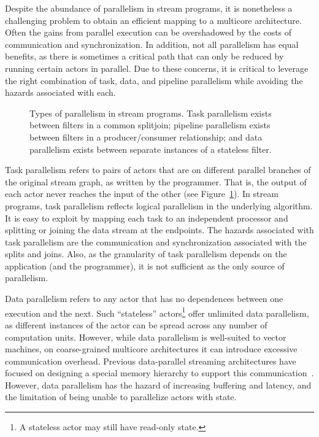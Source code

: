 
Despite the abundance of parallelism in stream programs, it is
nonetheless a challenging problem to obtain an efficient mapping to a
multicore architecture.  Often the gains from parallel execution can
be overshadowed by the costs of communication and synchronization.  In
addition, not all parallelism has equal benefits, as there is
sometimes a critical path that can only be reduced by running certain
actors in parallel.  Due to these concerns, it is critical to leverage
the right combination of task, data, and pipeline parallelism while
avoiding the hazards associated with each.

\begin{figure}[t]
\centering
{}
\caption[Types of parallelism in stream programs]{Types of parallelism
  in stream programs.  Task parallelism exists between filters in a
  common splitjoin; pipeline parallelism exists between filters in a
  producer/consumer relationship; and data parallelism exists between
  separate instances of a stateless
  filter.\protect\label{fig:parallelism}}
\end{figure}

Task parallelism refers to pairs of actors that are on different
parallel branches of the original stream graph, as written by the
programmer.  That is, the output of each actor never reaches the input
of the other (see Figure~\ref{fig:parallelism}).  In stream
programs, task parallelism reflects logical parallelism in the
underlying algorithm.  It is easy to exploit by mapping each task to
an independent processor and splitting or joining the data stream at
the endpoints.  The hazards associated with task parallelism are the
communication and synchronization associated with the splits and
joins.  Also, as the granularity of task parallelism depends on the
application (and the programmer), it is not sufficient as the only
source of parallelism.

Data parallelism refers to any actor that has no dependences between
one execution and the next.  Such ``stateless'' actors\footnote{A
  stateless actor may still have read-only state.}  offer unlimited
data parallelism, as different instances of the actor can be spread
across any number of computation units.  However, while data
parallelism is well-suited to vector machines, on coarse-grained
multicore architectures it can introduce excessive communication
overhead.  Previous data-parallel streaming architectures have focused
on designing a special memory hierarchy to support this
communication~\cite{imagine03ieee}.  However, data parallelism has the
hazard of increasing buffering and latency, and the limitation of
being unable to parallelize actors with state.

